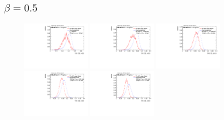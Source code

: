 \subsection*{$\beta=0.5$}
\vspace{-0.5cm}
\begin{figure}
\includegraphics[width=0.3\textwidth]{sascha_input/Appendix/Distributions/w/distributions/beta05/h_assisted_tj_C2_05_bin1.pdf} \hspace{1mm}
\includegraphics[width=0.3\textwidth]{sascha_input/Appendix/Distributions/w/distributions/beta05/h_assisted_tj_C2_05_bin2.pdf} \hspace{1mm}
\includegraphics[width=0.3\textwidth]{sascha_input/Appendix/Distributions/w/distributions/beta05/h_assisted_tj_C2_05_bin3.pdf} 
\bigskip
\includegraphics[width=0.3\textwidth]{sascha_input/Appendix/Distributions/w/distributions/beta05/h_assisted_tj_C2_05_bin4.pdf} \hspace{1mm}
\includegraphics[width=0.3\textwidth]{sascha_input/Appendix/Distributions/w/distributions/beta05/h_assisted_tj_C2_05_bin5.pdf} \hspace{1mm}

\end{figure}
